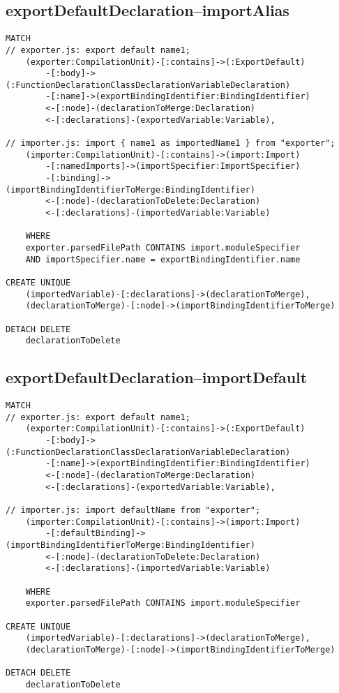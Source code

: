 \newpage
\subsection{exportDefaultDeclaration–importAlias}
\begin{lstlisting}[language=Cypher]
MATCH
// exporter.js: export default name1;
    (exporter:CompilationUnit)-[:contains]->(:ExportDefault)
        -[:body]->(:FunctionDeclarationClassDeclarationVariableDeclaration)
        -[:name]->(exportBindingIdentifier:BindingIdentifier)
        <-[:node]-(declarationToMerge:Declaration)
        <-[:declarations]-(exportedVariable:Variable),

// importer.js: import { name1 as importedName1 } from "exporter";
    (importer:CompilationUnit)-[:contains]->(import:Import)
        -[:namedImports]->(importSpecifier:ImportSpecifier)
        -[:binding]->(importBindingIdentifierToMerge:BindingIdentifier)
        <-[:node]-(declarationToDelete:Declaration)
        <-[:declarations]-(importedVariable:Variable)

    WHERE
    exporter.parsedFilePath CONTAINS import.moduleSpecifier
    AND importSpecifier.name = exportBindingIdentifier.name

CREATE UNIQUE
    (importedVariable)-[:declarations]->(declarationToMerge),
    (declarationToMerge)-[:node]->(importBindingIdentifierToMerge)

DETACH DELETE
    declarationToDelete
\end{lstlisting}

\newpage
\subsection{exportDefaultDeclaration–importDefault}
\begin{lstlisting}[language=Cypher]
MATCH
// exporter.js: export default name1;
    (exporter:CompilationUnit)-[:contains]->(:ExportDefault)
        -[:body]->(:FunctionDeclarationClassDeclarationVariableDeclaration)
        -[:name]->(exportBindingIdentifier:BindingIdentifier)
        <-[:node]-(declarationToMerge:Declaration)
        <-[:declarations]-(exportedVariable:Variable),

// importer.js: import defaultName from "exporter";
    (importer:CompilationUnit)-[:contains]->(import:Import)
        -[:defaultBinding]->(importBindingIdentifierToMerge:BindingIdentifier)
        <-[:node]-(declarationToDelete:Declaration)
        <-[:declarations]-(importedVariable:Variable)

    WHERE
    exporter.parsedFilePath CONTAINS import.moduleSpecifier

CREATE UNIQUE
    (importedVariable)-[:declarations]->(declarationToMerge),
    (declarationToMerge)-[:node]->(importBindingIdentifierToMerge)

DETACH DELETE
    declarationToDelete
\end{lstlisting}

